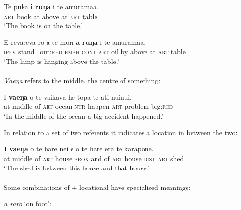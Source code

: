 \ea\label{ex:3.146}
\gll Te puka \textbf{{\ꞌ}i} \textbf{ruŋa} i te {\ꞌ}amurama{\ꞌ}a. \\
\textsc{art} book at above at \textsc{art} table \\

\glt 
‘The book is on the table.’ \textstyleExampleref{[Notes]}
\z

\ea\label{ex:3.147}
\gll E revareva rō {\ꞌ}ā te mōrī \textbf{a} \textbf{ruŋa} i te {\ꞌ}amurama{\ꞌ}a. \\
\textsc{ipfv} stand\_out:\textsc{red} \textsc{emph} \textsc{cont} \textsc{art} oil by above at \textsc{art} table \\

\glt 
‘The lamp is hanging above the table.’ \textstyleExampleref{[Notes]}
\z

\paragraph{}\label{sec:3.6.2.3.4} \textit{Vāeŋa} refers to the middle, the centre of something: 

\ea\label{ex:3.148}
\gll {\ꞌ}I \textbf{vāeŋa} o te vaikava he topa te {\ꞌ}ati nuinui.\\
at middle of \textsc{art} ocean \textsc{ntr} happen \textsc{art} problem big:\textsc{red}\\

\glt
‘In the middle of the ocean a big accident happened.’ \textstyleExampleref{[Fel-40-026]}
\z

In relation to a set of two referents it indicates a location in between the two:

\ea\label{ex:3.149}
\gll \textbf{{\ꞌ}I} \textbf{vāeŋa} o te hare nei {\ꞌ}e o te hare era te karapone. \\
at middle of \textsc{art} house \textsc{prox} and of \textsc{art} house \textsc{dist} \textsc{art} shed \\

\glt
‘The shed is between this house and that house.’ \textstyleExampleref{[Notes]}
\z

\paragraph{}\label{sec:3.6.2.3.5} Some combinations of  + locational have specialised meanings:

\smallskip 

\textit{a raro} ‘on foot’:

